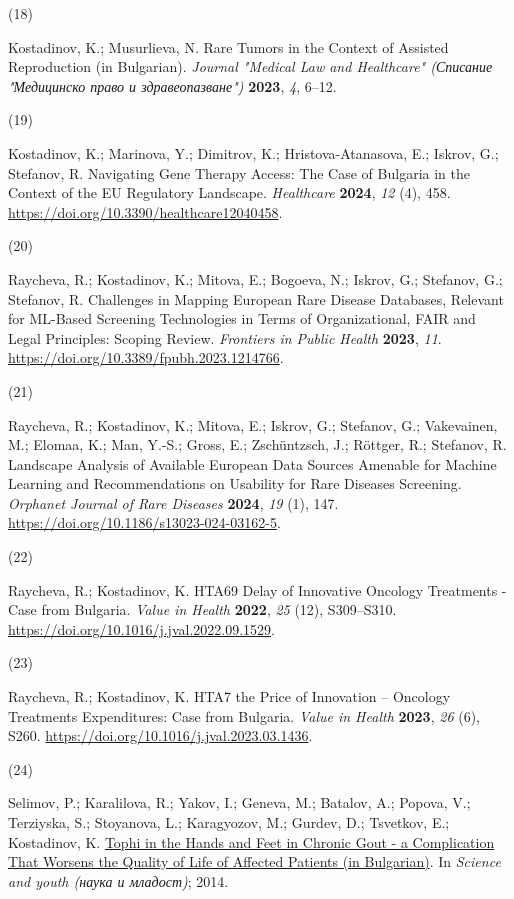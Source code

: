 \documentclass[
  12pt,
  letterpaper,
  DIV=11,
  numbers=noendperiod]{scrartcl}
\newlength{\cslhangindent}
\newlength{\csllabelwidth}
\newenvironment{CSLReferences}[2] %
 {\begin{list}{}{%
  \setlength{\itemindent}{0pt}
  \setlength{\leftmargin}{0pt}
  \setlength{\parsep}{0pt}
  \ifodd #1
   \setlength{\leftmargin}{\cslhangindent}
   \setlength{\itemindent}{-1\cslhangindent}
  \fi
  \setlength{\itemsep}{#2\baselineskip}}}
 {\end{list}}
\newcommand{\CSLLeftMargin}[1]{\parbox[t]{\csllabelwidth}{\strut#1\strut}}
\newcommand{\CSLRightInline}[1]{\parbox[t]{\linewidth - \csllabelwidth}{\strut#1\strut}}
\begin{document}
\begin{CSLReferences}{0}{0}
\CSLLeftMargin{(18) }%
\CSLRightInline{Kostadinov, K.; Musurlieva, N. Rare Tumors in the
Context of Assisted Reproduction (in Bulgarian). \emph{Journal "Medical
Law and Healthcare" (Списание "Медицинско право и здравеопазване")}
\textbf{2023}, \emph{4}, 6--12.}

\CSLLeftMargin{(19) }%
\CSLRightInline{Kostadinov, K.; Marinova, Y.; Dimitrov, K.;
Hristova-Atanasova, E.; Iskrov, G.; Stefanov, R. Navigating Gene Therapy
Access: The Case of Bulgaria in the Context of the EU Regulatory
Landscape. \emph{Healthcare} \textbf{2024}, \emph{12} (4), 458.
\url{https://doi.org/10.3390/healthcare12040458}.}

\CSLLeftMargin{(20) }%
\CSLRightInline{Raycheva, R.; Kostadinov, K.; Mitova, E.; Bogoeva, N.;
Iskrov, G.; Stefanov, G.; Stefanov, R. Challenges in Mapping European
Rare Disease Databases, Relevant for ML-Based Screening Technologies in
Terms of Organizational, FAIR and Legal Principles: Scoping Review.
\emph{Frontiers in Public Health} \textbf{2023}, \emph{11}.
\url{https://doi.org/10.3389/fpubh.2023.1214766}.}

\CSLLeftMargin{(21) }%
\CSLRightInline{Raycheva, R.; Kostadinov, K.; Mitova, E.; Iskrov, G.;
Stefanov, G.; Vakevainen, M.; Elomaa, K.; Man, Y.-S.; Gross, E.;
Zschüntzsch, J.; Röttger, R.; Stefanov, R. Landscape Analysis of
Available European Data Sources Amenable for Machine Learning and
Recommendations on Usability for Rare Diseases Screening. \emph{Orphanet
Journal of Rare Diseases} \textbf{2024}, \emph{19} (1), 147.
\url{https://doi.org/10.1186/s13023-024-03162-5}.}

\CSLLeftMargin{(22) }%
\CSLRightInline{Raycheva, R.; Kostadinov, K. HTA69 Delay of Innovative
Oncology Treatments - Case from Bulgaria. \emph{Value in Health}
\textbf{2022}, \emph{25} (12), S309--S310.
\url{https://doi.org/10.1016/j.jval.2022.09.1529}.}

\CSLLeftMargin{(23) }%
\CSLRightInline{Raycheva, R.; Kostadinov, K. HTA7 the Price of
Innovation -- Oncology Treatments Expenditures: Case from Bulgaria.
\emph{Value in Health} \textbf{2023}, \emph{26} (6), S260.
\url{https://doi.org/10.1016/j.jval.2023.03.1436}.}

\CSLLeftMargin{(24) }%
\CSLRightInline{Selimov, P.; Karalilova, R.; Yakov, I.; Geneva, M.;
Batalov, A.; Popova, V.; Terziyska, S.; Stoyanova, L.; Karagyozov, M.;
Gurdev, D.; Tsvetkov, E.; Kostadinov, K.
\href{https://asclepius.bg/cnm/wp-content/uploads/2022/05/sbornik-2014.pdf}{Tophi
in the Hands and Feet in Chronic Gout - a Complication That Worsens the
Quality of Life of Affected Patients (in Bulgarian)}. In \emph{Science
and youth (наука и младост)}; 2014.}


\end{CSLReferences}
\end{document}

